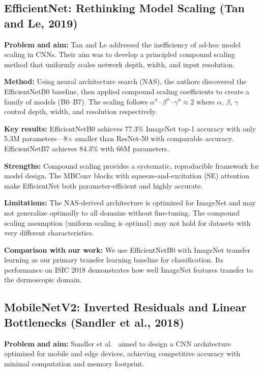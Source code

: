 \documentclass[10pt,twocolumn]{article}
\begin{document}
\subsection{EfficientNet: Rethinking Model Scaling (Tan and Le, 2019)}

\textbf{Problem and aim:} Tan and Le \cite{EfficientNet2019} addressed the inefficiency of ad-hoc model scaling in CNNs. Their aim was to develop a principled compound scaling method that uniformly scales network depth, width, and input resolution.

\textbf{Method:} Using neural architecture search (NAS), the authors discovered the EfficientNetB0 baseline, then applied compound scaling coefficients to create a family of models (B0--B7). The scaling follows $\alpha^{\phi} \cdot \beta^{\phi} \cdot \gamma^{\phi} \approx 2$ where $\alpha$, $\beta$, $\gamma$ control depth, width, and resolution respectively.

\textbf{Key results:} EfficientNetB0 achieves 77.3\% ImageNet top-1 accuracy with only 5.3M parameters---8$\times$ smaller than ResNet-50 with comparable accuracy. EfficientNetB7 achieves 84.3\% with 66M parameters.

\textbf{Strengths:} Compound scaling provides a systematic, reproducible framework for model design. The MBConv blocks with squeeze-and-excitation (SE) attention make EfficientNet both parameter-efficient and highly accurate.

\textbf{Limitations:} The NAS-derived architecture is optimized for ImageNet and may not generalize optimally to all domains without fine-tuning. The compound scaling assumption (uniform scaling is optimal) may not hold for datasets with very different characteristics.

\textbf{Comparison with our work:} We use EfficientNetB0 with ImageNet transfer learning as our primary transfer learning baseline for classification. Its performance on ISIC 2018 demonstrates how well ImageNet features transfer to the dermoscopic domain.

\subsection{MobileNetV2: Inverted Residuals and Linear Bottlenecks (Sandler et al., 2018)}

\textbf{Problem and aim:} Sandler et al.\ \cite{MobileNetV2_2018} aimed to design a CNN architecture optimized for mobile and edge devices, achieving competitive accuracy with minimal computation and memory footprint.
\end{document}

